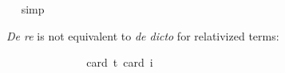 \begin{isabellebody}
\ %
%
\isamarkupfalse%
\ simp%
%
%
%
\begin{isamarkuptext}%
\emph{De re} is not equivalent to \emph{de dicto} for relativized terms:%
\end{isamarkuptext}\isamarkuptrue%
\isamarkupfalse%
\ {\isachardoublequoteopen}{\isasymlfloor}\isactrlbold {\isasymforall}{\isasymalpha}{\isachardot}\ {\isacharparenleft}{\isacharparenleft}{\isasymlambda}{\isasymbeta}{\isachardot}\ \isactrlbold {\isasymbox}{\isacharparenleft}{\isasymalpha}\ {\isasymbeta}{\isacharparenright}{\isacharparenright}\ \isactrlbold {\isasymdown}{\isacharparenleft}{\isasymtau}{\isacharcolon}{\isacharcolon}{\isasymup}{\isasymlangle}{\isasymzero}{\isasymrangle}{\isacharparenright}{\isacharparenright}\ \isactrlbold {\isasymleftrightarrow}\ \isactrlbold {\isasymbox}{\isacharparenleft}{\isacharparenleft}{\isasymlambda}{\isasymbeta}{\isachardot}\ {\isacharparenleft}{\isasymalpha}\ {\isasymbeta}{\isacharparenright}{\isacharparenright}\ \isactrlbold {\isasymdown}{\isasymtau}{\isacharparenright}{\isasymrfloor}{\isachardoublequoteclose}\ \isanewline
\ \ \isamarkupfalse%
{\isacharbrackleft}card\ {\isacharprime}t{\isacharequal}{}{\isacharcomma}\ card\ i{\isacharequal}{}{\isacharbrackright}%
\ %
%
\isamarkupfalse%
\ %
\isanewline
%
%
%
%
%
%
%
%
%
%
\end{isabellebody}%
